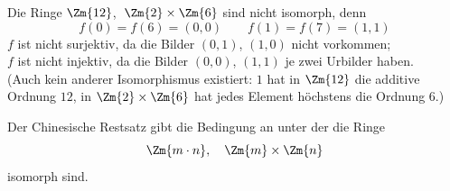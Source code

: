 \begin{beispiel}
Die Ringe $\Zm{12}$, $\;\Zm{2} \times \Zm{6}$ sind nicht isomorph, denn
\[ f(0) = f(6) = (0,0) \qquad f(1) = f(7) = (1,1) \]
$f$ ist nicht surjektiv, da die Bilder $(0, 1)$, $(1, 0)$ nicht vorkommen;\\
$f$ ist nicht injektiv, da die Bilder $(0, 0)$, $(1, 1)$ je zwei Urbilder haben.\\
(Auch kein anderer Isomorphismus existiert: $1$ hat in $\Zm{12}$ die additive Ordnung $12$, in $\Zm{2} \times \Zm{6}$ hat jedes Element höchstens die Ordnung $6$.)
\end{beispiel}

Der Chinesische Restsatz gibt die Bedingung an unter der die Ringe
\[ \Zm{m \cdot n}, \quad \Zm{m} \times \Zm{n} \]
isomorph sind.
